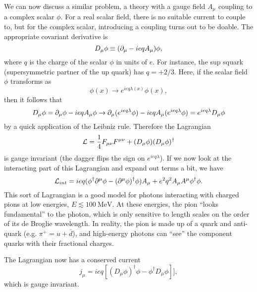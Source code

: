 We can now discuss a similar problem, a theory with a gauge field $A_\mu$ coupling to a complex scalar $\phi$. For a real scalar field, there is no suitable current to couple to, but for the complex scalar, introducing a coupling turns out to be doable. The appropriate covariant derivative is
\begin{equation}
    D_\mu \phi \equiv (\partial_\mu - ieq A_\mu) \phi,
\end{equation}
where $q$ is the charge of the scalar $\phi$ in units of $e$. For instance, the sup squark (supersymmetric partner of the up quark) has $q=+2/3$. Here, if the scalar field $\phi$ transforms as
\begin{equation}
    \phi(x) \to e^{ie q \lambda(x)}\phi(x),
\end{equation}
then it follows that
\begin{equation}
    D_\mu \phi=\partial_\mu \phi - ieq A_\mu \phi \to \partial_\mu (e^{ie q \lambda}\phi) - ieq A_\mu (e^{ie q\lambda}\phi) = e^{ie q \lambda} D_\mu \phi
\end{equation}
by a quick application of the Leibniz rule. Therefore the Lagrangian
\begin{equation}
    \mathcal L = \frac{1}{4} F_{\mu\nu} F^{\mu\nu} + (D_\mu \phi)(D_\mu \phi)^\dagger
\end{equation}
is gauge invariant (the dagger flips the sign on $e^{ie q \lambda}$). If we now look at the interacting part of this Lagrangian and expand out terms a bit, we have
\begin{equation}
    \mathcal L_{int}= ieq (\phi^\dagger \partial^\mu \phi -(\partial^\mu \phi)^\dagger \phi)A_\mu + e^2 q^2 A_\mu A^\mu \phi^\dagger \phi.
\end{equation}
This sort of Lagrangian is a good model for photons interacting with charged pions at low energies, $E \lesssim \SI{100}{\mega\electronvolt}$. At these energies, the pion ``looks fundamental'' to the photon, which is only sensitive to length scales on the order of its de Broglie wavelength. In reality, the pion is made up of a quark and anti-quark (e.g. $\pi^+= u + \bar d$), and high-energy photons can ``see'' the component quarks with their fractional charges.

The Lagrangian now has a conserved current
$$j_\mu = ieq[(D_\mu \phi)^\dagger \phi - \phi^\dagger D_\mu \phi]],$$
which is gauge invariant.


